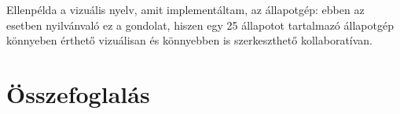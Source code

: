 Ellenpélda a vizuális nyelv, amit implementáltam, az állapotgép: ebben az esetben nyilvánvaló ez a gondolat, hiszen egy 25 állapotot tartalmazó állapotgép könnyeben érthető vizuálisan és könnyebben is szerkeszthető kollaboratívan.



\section{Összefoglalás}




